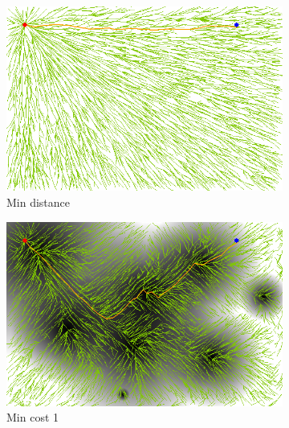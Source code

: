 \documentclass{article}
\begin{document}
\begin{figure}[h!]
	\centering
	\begin{subfigure}[t]{0.3\linewidth}
		\centering
		\includegraphics[width=\textwidth]{fig/sim2-2obj/MORRTstar00-0.png}
		\caption{Min distance}
		\label{fig:sim:norm:distance}
	\end{subfigure}
	\begin{subfigure}[t]{0.3\linewidth}
		\centering
		\includegraphics[width=\textwidth]{fig/sim2-2obj/MORRTstar00-1.png}
		\caption{Min cost 1}
		\label{fig:sim:norm:fitness1}
	\end{subfigure}  \\
	\begin{subfigure}[b]{0.3\linewidth}
		\centering

\end{subfigure}
\end{figure}
\end{document}
